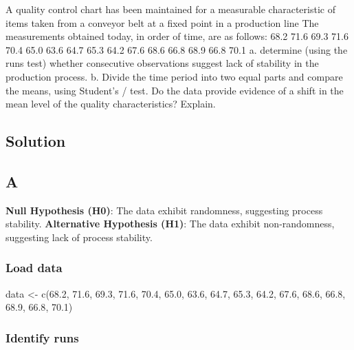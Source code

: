 \documentclass[
]{article}
\newenvironment{Shaded}{\begin{snugshade}}{\end{snugshade}}
\newcommand{\FloatTok}[1]{\textcolor[rgb]{0.00,0.00,0.81}{#1}}
\newcommand{\FunctionTok}[1]{\textcolor[rgb]{0.00,0.00,0.00}{#1}}
\newcommand{\NormalTok}[1]{#1}
\newcommand{\OtherTok}[1]{\textcolor[rgb]{0.56,0.35,0.01}{#1}}
\begin{document}
A quality control chart has been maintained for a measurable
characteristic of items taken from a conveyor belt at a fixed point in a
production line The measurements obtained today, in order of time, are
as follows: 68.2 71.6 69.3 71.6 70.4 65.0 63.6 64.7 65.3 64.2 67.6 68.6
66.8 68.9 66.8 70.1 a. determine (using the runs test) whether
consecutive observations suggest lack of stability in the production
process. b. Divide the time period into two equal parts and compare the
means, using Student's / test. Do the data provide evidence of a shift
in the mean level of the quality characteristics? Explain.

\hypertarget{solution-10}{%
\subsection{Solution}\label{solution-10}}

\hypertarget{a}{%
\subsection{A}\label{a}}

\textbf{Null Hypothesis (H0)}: The data exhibit randomness, suggesting
process stability. \textbf{Alternative Hypothesis (H1)}: The data
exhibit non-randomness, suggesting lack of process stability.

\hypertarget{load-data-10}{%
\subsubsection{Load data}\label{load-data-10}}

\begin{Shaded}
\begin{Highlighting}[]
\NormalTok{data }\OtherTok{\textless{}{-}} \FunctionTok{c}\NormalTok{(}\FloatTok{68.2}\NormalTok{, }\FloatTok{71.6}\NormalTok{, }\FloatTok{69.3}\NormalTok{, }\FloatTok{71.6}\NormalTok{, }\FloatTok{70.4}\NormalTok{, }\FloatTok{65.0}\NormalTok{, }\FloatTok{63.6}\NormalTok{, }\FloatTok{64.7}\NormalTok{,}
          \FloatTok{65.3}\NormalTok{, }\FloatTok{64.2}\NormalTok{, }\FloatTok{67.6}\NormalTok{, }\FloatTok{68.6}\NormalTok{, }\FloatTok{66.8}\NormalTok{, }\FloatTok{68.9}\NormalTok{, }\FloatTok{66.8}\NormalTok{, }\FloatTok{70.1}\NormalTok{)}
\end{Highlighting}
\end{Shaded}

\hypertarget{identify-runs}{%
\subsubsection{Identify runs}\label{identify-runs}}
\end{document}
